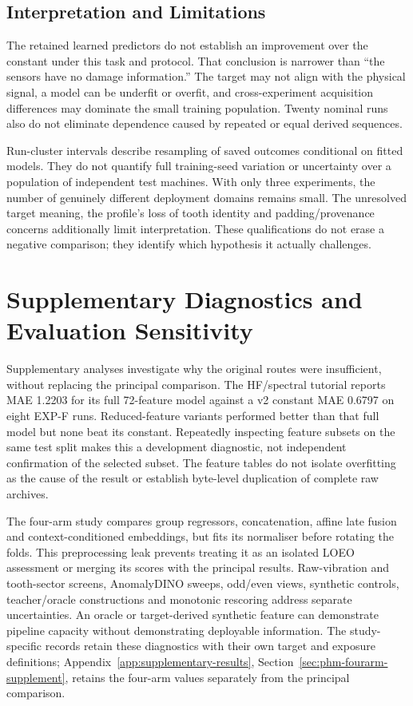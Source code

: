 \subsection{Interpretation and Limitations}
The retained learned predictors do not establish an improvement over the constant under
this task and protocol. That conclusion is narrower than ``the sensors have no damage
information.'' The target may not align with the physical signal, a model can be
underfit or overfit, and cross-experiment acquisition differences may dominate the small
training population. Twenty nominal runs also do not eliminate dependence caused by
repeated or equal derived sequences.

Run-cluster intervals describe resampling of saved outcomes conditional on fitted
models. They do not quantify full training-seed variation or uncertainty over a
population of independent test machines. With only three experiments, the number of
genuinely different deployment domains remains small. The unresolved target meaning, the
profile's loss of tooth identity and padding/provenance concerns additionally limit
interpretation. These qualifications do not erase a negative comparison; they identify
which hypothesis it actually challenges.

\section{Supplementary Diagnostics and Evaluation Sensitivity}
\label{sec:phm-diagnostics}
Supplementary analyses investigate why the original routes were insufficient, without
replacing the principal comparison. The HF/spectral tutorial reports MAE 1.2203 for its
full 72-feature model against a v2 constant MAE 0.6797 on eight EXP-F runs.
Reduced-feature variants performed better than that full model but none beat its
constant. Repeatedly inspecting feature subsets on the same test split makes this a
development diagnostic, not independent confirmation of the selected subset. The feature tables do not isolate overfitting as the cause of the result or establish
byte-level duplication of complete raw archives.

The four-arm study compares group regressors, concatenation, affine late fusion and
context-conditioned embeddings, but fits its normaliser before rotating the folds.
This preprocessing leak prevents treating it as an isolated LOEO assessment or merging
its scores with the principal results. Raw-vibration and tooth-sector screens, AnomalyDINO
sweeps, odd/even views, synthetic controls, teacher/oracle constructions and monotonic
rescoring address separate uncertainties. An oracle or target-derived synthetic feature
can demonstrate pipeline capacity without demonstrating deployable information. The
study-specific records retain these diagnostics with their own target and exposure
definitions; Appendix~\ref{app:supplementary-results}, Section~\ref{sec:phm-fourarm-supplement},
retains the four-arm values separately from the principal comparison.

